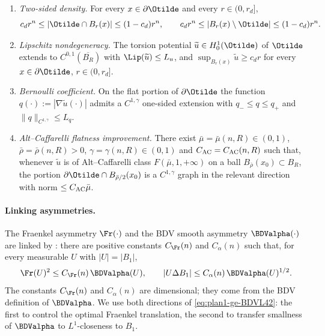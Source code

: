 \begin{enumerate}[label=\textup{(R\arabic*)},leftmargin=2.7em]
\item\label{R1} \emph{Two-sided density.} For every \(x\in\partial\Otilde\)
   and every \(r\in(0,r_d]\),
   \[
      c_d r^n
      \le|\Otilde\cap B_r(x)|
      \le(1-c_d)r^n,
      \qquad
      c_d r^n
      \le|B_r(x)\setminus\Otilde|
      \le(1-c_d)r^n.
   \]
\item\label{R2} \emph{Lipschitz nondegeneracy.} The torsion potential
   \(\widetilde u\in H^1_0(\Otilde)\) of \(\Otilde\) extends to
   \(C^{0,1}(\overline{B_R})\) with \(\Lip(\widetilde u)\le L_u\), and
   \(\sup_{B_r(x)}\widetilde u\ge c_d r\) for every
   \(x\in\partial\Otilde\), \(r\in(0,r_d]\).
\item\label{R3} \emph{Bernoulli coefficient.} On the flat portion of
   \(\partial\Otilde\) the function
   \(q(\cdot):=|\nabla\widetilde u(\cdot)|\) admits a \(C^{1,\gamma}\)
   one-sided extension with \(q_-\le q\le q_+\) and
   \(\|q\|_{C^{1,\gamma}}\le L_q\).
\item\label{R4} \emph{Alt--Caffarelli flatness improvement.} There exist
   \(\bar\mu=\bar\mu(n,R)\in(0,1)\), \(\bar\rho=\bar\rho(n,R)>0\),
   \(\gamma=\gamma(n,R)\in(0,1)\) and \(C_{\rm AC}=C_{\rm AC}(n,R)\) such
   that, whenever \(\widetilde u\) is of Alt--Caffarelli class
   \(F(\bar\mu,1,+\infty)\) on a ball \(B_{\bar\rho}(x_0)\subset B_R\),
   the portion \(\partial\Otilde\cap B_{\bar\rho/2}(x_0)\) is a
   \(C^{1,\gamma}\) graph in the relevant direction with norm
   \(\le C_{\rm AC}\bar\mu\).
\end{enumerate}

\paragraph{Linking asymmetries.}
The Fraenkel asymmetry \(\Fr(\cdot)\) and the BDV smooth asymmetry
\(\BDValpha(\cdot)\) are linked by
\cite[Lemma~4.2]{BDV}: there are positive constants \(C_{\Fr}(n)\) and
\(C_\alpha(n)\) such that, for every measurable \(U\) with \(|U|=|B_1|\),
\begin{equation}\label{eq:plan1-ge-BDVL42}
   \Fr(U)^2\le C_{\Fr}(n)\,\BDValpha(U),\qquad
   |U\Delta B_1|\le C_\alpha(n)\,\BDValpha(U)^{1/2}.
\end{equation}
The constants \(C_{\Fr}(n)\) and \(C_\alpha(n)\) are dimensional; they
come from the BDV definition of \(\BDValpha\). We use both directions of
\eqref{eq:plan1-ge-BDVL42}: the first to control the optimal Fraenkel
translation, the second to transfer smallness of \(\BDValpha\) to
\(L^1\)-closeness to \(B_1\).

